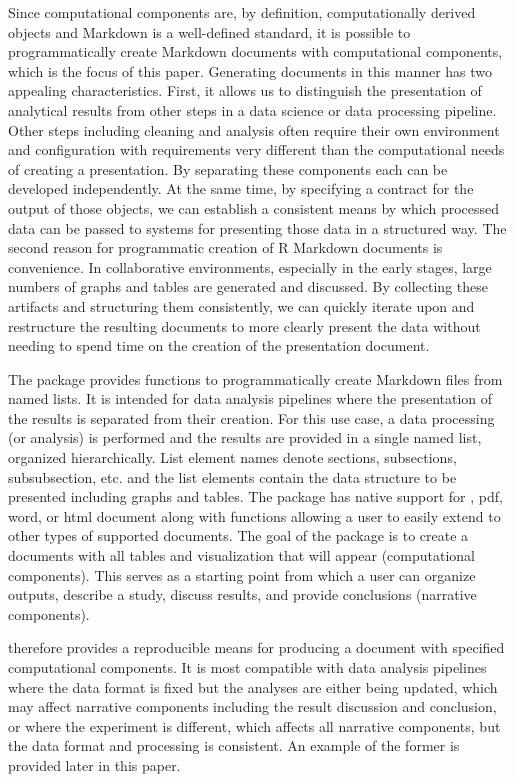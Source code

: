 \documentclass[
]{jss}
\begin{document}
Since computational components are, by definition, computationally
derived objects and  Markdown is a well-defined standard, it
is possible to programmatically create  Markdown documents
with computational components, which is the focus of this paper.
Generating documents in this manner has two appealing characteristics.
First, it allows us to distinguish the presentation of analytical
results from other steps in a data science or data processing pipeline.
Other steps including cleaning and analysis often require their own
environment and configuration with requirements very different than the
computational needs of creating a presentation. By separating these
components each can be developed independently. At the same time, by
specifying a contract for the output of those objects, we can establish
a consistent means by which processed data can be passed to systems for
presenting those data in a structured way. The second reason for
programmatic creation of R Markdown documents is convenience. In
collaborative environments, especially in the early stages, large
numbers of graphs and tables are generated and discussed. By collecting
these artifacts and structuring them consistently, we can quickly
iterate upon and restructure the resulting documents to more clearly
present the data without needing to spend time on the creation of the
presentation document.

The  package provides functions to programmatically create
 Markdown files from named lists. It is intended for data
analysis pipelines where the presentation of the results is separated
from their creation. For this use case, a data processing (or analysis)
is performed and the results are provided in a single named list,
organized hierarchically. List element names denote sections,
subsections, subsubsection, etc. and the list elements contain the data
structure to be presented including graphs and tables. The package has
native support for  \citep{blischak2019}, pdf, word, or
html document along with functions allowing a user to easily extend to
other types of supported documents. The goal of the package is to create
a documents with all tables and visualization that will appear
(computational components). This serves as a starting point from which a
user can organize outputs, describe a study, discuss results, and
provide conclusions (narrative components).

 therefore provides a reproducible means for producing a
document with specified computational components. It is most compatible
with data analysis pipelines where the data format is fixed but the
analyses are either being updated, which may affect narrative components
including the result discussion and conclusion, or where the experiment
is different, which affects all narrative components, but the data
format and processing is consistent. An example of the former is
provided later in this paper.
\end{document}
